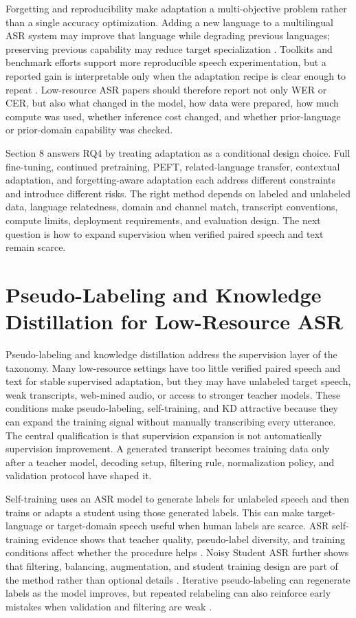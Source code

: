 \documentclass[pdflatex,sn-basic,iicol]{sn-jnl}
\theoremstyle{thmstyleone}
\theoremstyle{thmstyletwo}
\theoremstyle{thmstylethree}
\begin{document}
Forgetting and reproducibility make adaptation a multi-objective problem rather than a single accuracy optimization. Adding a new language to a multilingual ASR system may improve that language while degrading previous languages; preserving previous capability may reduce target specialization \citep{qian24_interspeech}. Toolkits and benchmark efforts support more reproducible speech experimentation, but a reported gain is interpretable only when the adaptation recipe is clear enough to repeat \citep{yang2021superb}. Low-resource ASR papers should therefore report not only WER or CER, but also what changed in the model, how data were prepared, how much compute was used, whether inference cost changed, and whether prior-language or prior-domain capability was checked.

Section 8 answers RQ4 by treating adaptation as a conditional design choice. Full fine-tuning, continued pretraining, PEFT, related-language transfer, contextual adaptation, and forgetting-aware adaptation each address different constraints and introduce different risks. The right method depends on labeled and unlabeled data, language relatedness, domain and channel match, transcript conventions, compute limits, deployment requirements, and evaluation design. The next question is how to expand supervision when verified paired speech and text remain scarce.

\section{Pseudo-Labeling and Knowledge Distillation for Low-Resource ASR}

Pseudo-labeling and knowledge distillation address the supervision layer of the taxonomy. Many low-resource settings have too little verified paired speech and text for stable supervised adaptation, but they may have unlabeled target speech, weak transcripts, web-mined audio, or access to stronger teacher models. These conditions make pseudo-labeling, self-training, and KD attractive because they can expand the training signal without manually transcribing every utterance. The central qualification is that supervision expansion is not automatically supervision improvement. A generated transcript becomes training data only after a teacher model, decoding setup, filtering rule, normalization policy, and validation protocol have shaped it.

Self-training uses an ASR model to generate labels for unlabeled speech and then trains or adapts a student using those generated labels. This can make target-language or target-domain speech useful when human labels are scarce. ASR self-training evidence shows that teacher quality, pseudo-label diversity, and training conditions affect whether the procedure helps \citep{kahn2019selftraining}. Noisy Student ASR further shows that filtering, balancing, augmentation, and student training design are part of the method rather than optional details \citep{park20d_interspeech}. Iterative pseudo-labeling can regenerate labels as the model improves, but repeated relabeling can also reinforce early mistakes when validation and filtering are weak \citep{xu2020iterativepseudolabeling,likhomanenko2020slimipl}.
\end{document}
